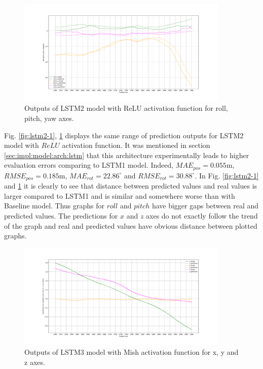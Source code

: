 \begin{figure}
	\begin{center}
		\includegraphics[width=0.9\textwidth, keepaspectratio]{gfx/lstm2_relu-roll_pitch_yaw.pdf}
		\caption{\label{fig:lstm2-2} Outputs of LSTM2 model with ReLU activation function for roll, pitch, yaw axes.}
	\end{center}
\end{figure}

Fig. \ref{fig:lstm2-1}, \ref{fig:lstm2-2} displays the same range of prediction outputs for LSTM2 model with $ReLU$ activation function. It was mentioned in section \ref{sec:impl:model:arch:lstm} that this architecture experimentally leads to higher evaluation errors comparing to LSTM1 model. Indeed,  $MAE_{pos} = 0.055$m, $RMSE_{pos} = 0.185$m, $MAE_{rot} = 22.86^{\circ}$ and $RMSE_{rot}  =30.88^{\circ}$. In Fig. \ref{fig:lstm2-1} and \ref{fig:lstm2-2} it is clearly to see that distance between predicted values and real values is larger compared to LSTM1 and is similar and somewhere worse than with Baseline model. Thus graphs for $roll$ and $pitch$ have bigger gaps between real and predicted values. The predictions for $x$ and $z$ axes do not exactly follow the trend of the graph and real and predicted values have obvious distance between plotted graphs. 


\begin{figure}[t!]
	\begin{center}
		\includegraphics[width=0.9\textwidth, keepaspectratio]{gfx/lstm3_mish-xyz_position.pdf}
		\caption{\label{fig:lstm3-1} Outputs of LSTM3 model with Mish activation function for x, y and z axes.}
	\end{center}
\end{figure}

